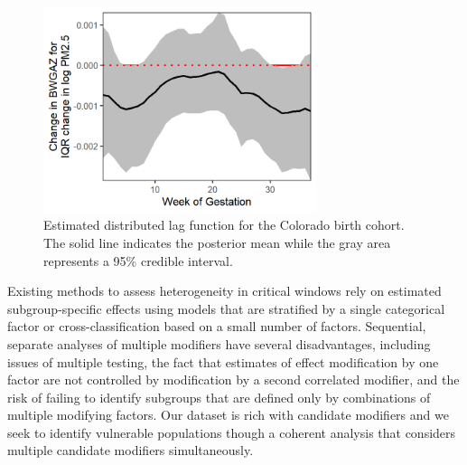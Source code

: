 \documentclass[12pt]{article}
\begin{document}
\begin{figure}[!ht]
    \centering
    \includegraphics[height=6cm]{img/bwgaz_tdlm.png}
    \caption{Estimated distributed lag function for the Colorado birth cohort. The solid line indicates the posterior mean while the gray area represents a 95\% credible interval.}
    \label{fig:est_tdlm}
\end{figure}

Existing methods to assess heterogeneity in critical windows rely on estimated subgroup-specific effects using models that are stratified by a single categorical factor or cross-classification based on a small number of factors. Sequential, separate analyses of multiple modifiers have several disadvantages, including issues of multiple testing, the fact that estimates of effect modification by one factor are not controlled by modification by a second correlated modifier, and the risk of failing to identify subgroups that are defined only by combinations of multiple modifying factors. Our dataset is rich with candidate modifiers and we seek to identify vulnerable populations though a coherent analysis that considers multiple candidate modifiers simultaneously. 

\end{document}
